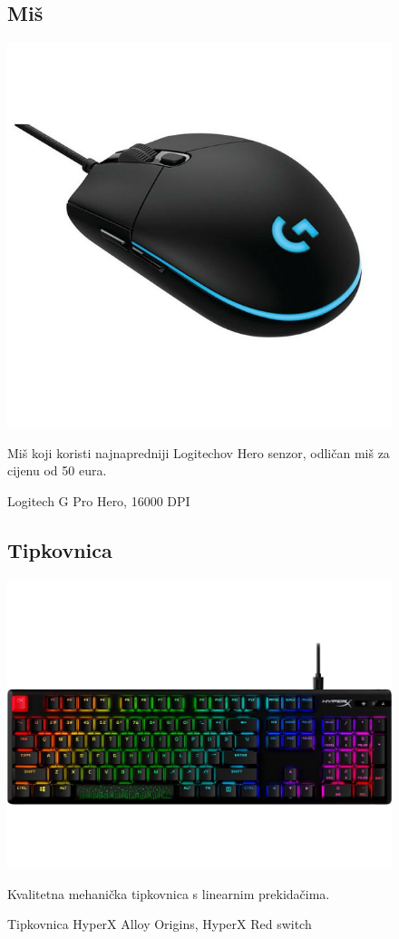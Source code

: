 \documentclass{article}
\begin{document}
\begin{figure}[H]
\subsection{Miš}
\centering
\includegraphics[scale=0.2]{Slike/m.jpg}
\caption{Logitech G Pro Hero, 16000 DPI}
Miš koji koristi najnapredniji Logitechov Hero senzor, odličan miš za cijenu od 50 eura.
\end{figure}

\begin{figure}[H]
\subsection{Tipkovnica}
\centering
\includegraphics[scale=0.3]{Slike/k.jpg}
\caption{Tipkovnica HyperX Alloy Origins, HyperX Red switch}
Kvalitetna mehanička tipkovnica s linearnim prekidačima.
\end{figure}
\end{document}
